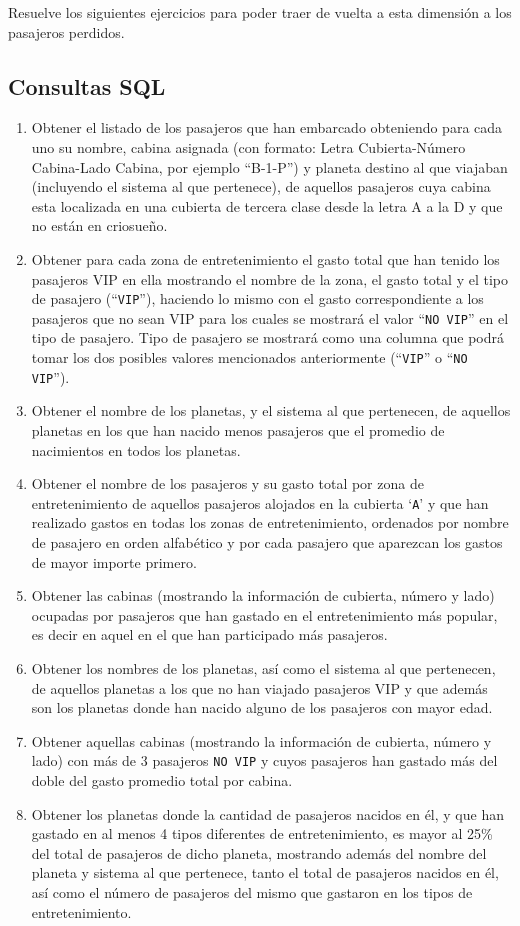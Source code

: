 \documentclass{db-practice}
\begin{document}
Resuelve los siguientes ejercicios para poder traer de vuelta a esta dimensión a los pasajeros perdidos.

\subsection*{Consultas SQL}

\begin{enumerate}
    \item Obtener el listado de los pasajeros que han embarcado obteniendo para cada uno su nombre, cabina asignada (con formato: Letra Cubierta-Número Cabina-Lado Cabina, por ejemplo ``B-1-P'') y planeta destino al que viajaban (incluyendo el sistema al que pertenece), de aquellos pasajeros cuya cabina esta localizada en una cubierta de tercera clase desde la letra A a la D y que no están en criosueño.
    \item Obtener para cada zona de entretenimiento el gasto total que han tenido los pasajeros VIP en ella mostrando el nombre de la zona, el gasto total y el tipo de pasajero (``\texttt{VIP}''), haciendo lo mismo con el gasto correspondiente a los pasajeros que no sean VIP para los cuales se mostrará el valor ``\texttt{NO VIP}'' en el tipo de pasajero. Tipo de pasajero se mostrará como una columna que podrá tomar los dos posibles valores mencionados anteriormente (``\texttt{VIP}'' o ``\texttt{NO VIP}'').
    \item Obtener el nombre de los planetas, y el sistema al que pertenecen, de aquellos planetas en los que han nacido menos pasajeros que el promedio de nacimientos en todos los planetas.
    \item Obtener el nombre de los pasajeros y su gasto total por zona de entretenimiento de aquellos pasajeros alojados en la cubierta `\texttt{A}' y que han realizado gastos en todas los zonas de entretenimiento, ordenados por nombre de pasajero en orden alfabético y por cada pasajero que aparezcan los gastos de mayor importe primero.
    \item Obtener las cabinas (mostrando la información de cubierta, número y lado) ocupadas por pasajeros que han gastado en el entretenimiento más popular, es decir en aquel en el que han participado más pasajeros.
    \item Obtener los nombres de los planetas, así como el sistema al que pertenecen, de aquellos planetas a los que no han viajado pasajeros VIP y que además son los planetas donde han nacido alguno de los pasajeros con mayor edad.
    \item Obtener aquellas cabinas (mostrando la información de cubierta, número y lado) con más de 3 pasajeros \texttt{NO VIP} y cuyos pasajeros han gastado más del doble del gasto promedio total por cabina.
    \item Obtener los planetas donde la cantidad de pasajeros nacidos en él, y que han gastado en al menos 4 tipos diferentes de entretenimiento, es mayor al 25\% del total de pasajeros de dicho planeta, mostrando además del nombre del planeta y sistema al que pertenece, tanto el total de pasajeros nacidos en él, así como el número de pasajeros del mismo que gastaron en los tipos de entretenimiento.

\end{enumerate}
\end{document}
